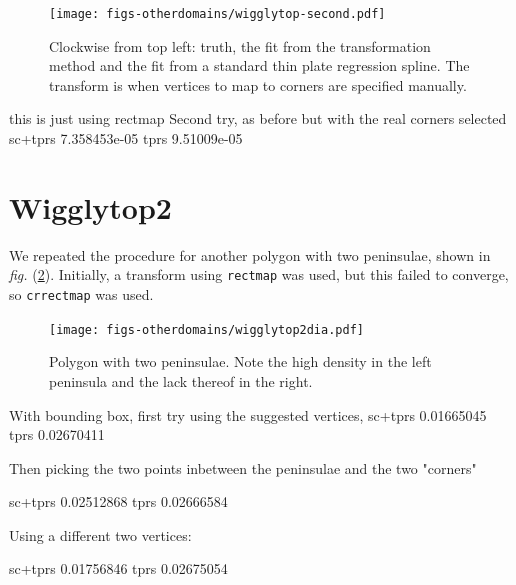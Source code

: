 \documentclass[a4paper,10pt]{amsart}
\newcommand{\fig}[1]{\emph{fig.} (\ref{#1})}
\begin{document}
\begin{figure}
\centering
\texttt{[image: figs-otherdomains/wigglytop-second.pdf]} \\
\caption{Clockwise from top left: truth, the fit from the transformation method and the fit from a standard thin plate regression spline. The transform is when vertices to map to corners are specified manually.}
\label{wigglyseccomp}
\end{figure}




this is just using rectmap
Second try, as before but with the real corners selected
sc+tprs 7.358453e-05 
tprs 9.51009e-05 




\section{Wigglytop2}

We repeated the procedure for another polygon with two peninsulae, shown in \fig{wigglytop2dia}. Initially, a transform using \texttt{rectmap} was used, but this failed to converge, so \texttt{crrectmap} was used.



\begin{figure}
\centering
\texttt{[image: figs-otherdomains/wigglytop2dia.pdf]} \\
\caption{Polygon with two peninsulae. Note the high density in the left peninsula and the lack thereof in the right.}
\label{wigglytop2dia}
\end{figure}




With bounding box, first try using the suggested vertices, 
sc+tprs 0.01665045 
tprs 0.02670411 


Then picking the two points inbetween the peninsulae and the two "corners"

sc+tprs 0.02512868 
tprs 0.02666584 


Using a different two vertices:

sc+tprs 0.01756846 
tprs 0.02675054 




\end{document}
